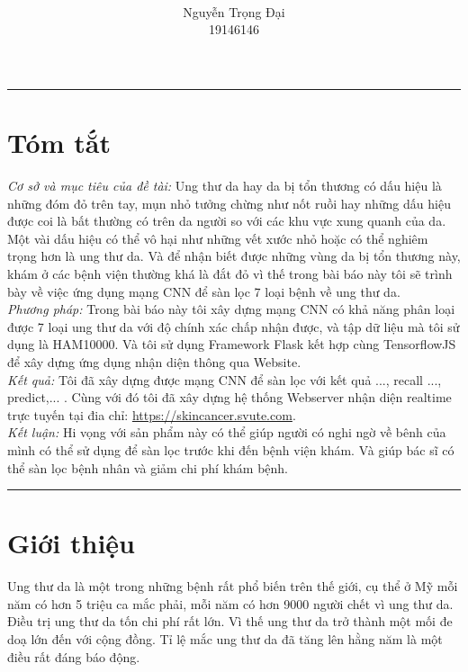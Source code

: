 \documentclass[12pt,a4paper]{article}
\title{
	\centering\normalsize  
	\vspace{-0.7in}
	\colorbox{black}{\parbox{\linewidth}{\textcolor{white}{\hfill\HCMUTE \hfill}}} \\[0.5ex]
	\begin{minipage}{\dimexpr0.5\linewidth-0.5\wlogo}\oriart\end{minipage}%
	\begin{minipage}{\dimexpr0.5\linewidth+0.5\wlogo-6pt}\LOGO \end{minipage}\\[0.5ex]
	\colorbox{black}{\parbox{\linewidth}{\textcolor{white}{\hfill\KHCMUTE\hfill}}}\\[1ex]
	\titleofArt
}
\author{Nguyễn Trọng Đại\\19146146}
\date{}
\begin{document}
	\maketitle
	\thispagestyle{Initial}
	\noindent
	\rule{\textwidth}{0.4pt}
	
	\section*{Tóm tắt}
	
	\textit{Cơ sở và mục tiêu của đề tài:} Ung thư da hay da bị tổn thương có dấu hiệu là những đóm đỏ trên tay, mụn nhỏ tưởng chừng như nốt ruồi hay những dấu hiệu được coi là bất thường có trên da người so với các khu vực xung quanh của da. Một vài dấu hiệu có thể vô hại như những vết xước nhỏ hoặc có thể nghiêm trọng hơn là ung thư da. Và để nhận biết được những vùng da bị tổn thương này, khám ở các bệnh viện thường khá là đắt đỏ vì thế trong bài báo này tôi sẽ trình bày về việc ứng dụng mạng CNN để sàn lọc 7 loại bệnh về ung thư da.\\
	
	\noindent
	\textit{Phương pháp:} Trong bài báo này tôi xây dựng mạng CNN có khả năng phân loại được 7 loại ung thư da với độ chính xác chấp nhận được, và tập dữ liệu mà tôi sử dụng là HAM10000. Và tôi sử dụng Framework Flask kết hợp cùng TensorflowJS để xây dựng ứng dụng nhận diện thông qua Website.\\
	
	\noindent
	\textit{Kết quả:} Tôi đã xây dựng được mạng CNN để sàn lọc với kết quả ..., recall ..., predict,... . Cùng với đó tôi đã xây dựng hệ thống Webserver nhận diện realtime trực tuyến tại đia chỉ: \href{https://skincancer.svute.com}{https://skincancer.svute.com}.\\
	
	\noindent
	\textit{Kết luận:} Hi vọng với sản phẩm này có thể giúp người có nghi ngờ về bênh của mình có thể sử dụng để sàn lọc trước khi đến bệnh viện khám. Và giúp bác sĩ có thể sàn lọc bệnh nhân và giảm chi phí khám bệnh.
	
	\hfill \break
	\noindent
	\rule{\textwidth}{0.4pt}
	
	\section{Giới thiệu}
	Ung thư da là một trong những bệnh rất phổ biến trên thế giới, cụ thể ở Mỹ mỗi năm có hơn 5 triệu ca mắc phải, mỗi năm có hơn 9000 người chết vì ung thư da. Điều trị ung thư da tốn chi phí rất lớn. Vì thế ung thư da trở thành một mối đe doạ lớn đến với cộng đồng. Tỉ lệ mắc ung thư da đã tăng lên hằng năm là một điều rất đáng báo động.\\
	
\end{document}
